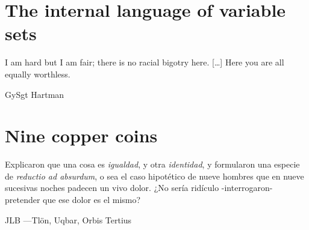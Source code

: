 \documentclass{amsart}
\begin{document}
\section{The internal language of variable sets}
\epigraph{I am hard but I am fair; there is no racial bigotry here. [\dots\unkern] Here you are all equally worthless.}{GySgt Hartman}
\section{Nine copper coins}
\epigraph{Explicaron que una cosa es \emph{igualdad}, y otra \emph{identidad}, y formularon una especie de \emph{reductio ad absurdum}, o sea el caso hipotético de nueve hombres que en nueve sucesivas noches padecen un vivo dolor. ¿No sería ridículo -interrogaron- pretender que ese dolor es el mismo?}{JLB ---Tl\"on, Uqbar, Orbis Tertius}
\end{document}
